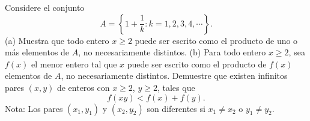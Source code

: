 Considere el conjunto
\[A = \left\{1+\frac{1}{k} : k=1,2,3,4,\cdots \right\}.\]
(a) Muestra que todo entero $x \ge 2$ puede ser escrito como el producto de uno o más elementos de
$A$, no necesariamente distintos.
(b) Para todo entero $x \ge 2$, sea $f(x)$ el menor entero tal que $x$ puede ser escrito como el producto de
$f(x)$ elementos de $A$, no necesariamente distintos.
Demuestre que existen infinitos pares $(x, y)$ de enteros con $x \ge 2$, $y \ge 2$, tales que
\[f (xy) \lt f (x) + f (y).\]
Nota: Los pares $(x_1, y_1)$ y $(x_2, y_2)$ son diferentes si $x_1 \neq x_2$ o $y_1 \neq y_2$.